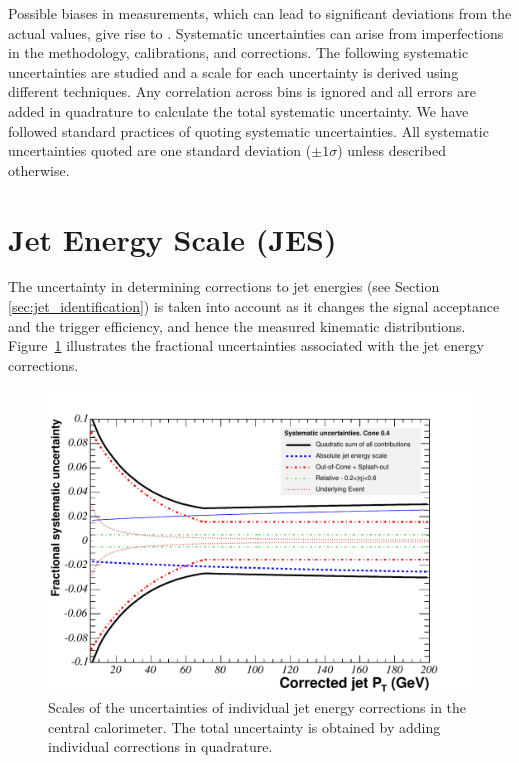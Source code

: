 \vspace{0.015\textheight}
Possible biases in measurements, which can lead to significant deviations from the actual values, give rise to . Systematic uncertainties can arise from imperfections in the methodology, calibrations, and corrections. The following systematic uncertainties are studied and a scale for each uncertainty is derived using different techniques. Any correlation across bins is ignored and all errors are added in quadrature to calculate the total systematic uncertainty. We have followed standard practices of quoting systematic uncertainties. All systematic uncertainties quoted are one standard deviation ($\pm1\sigma$) unless described otherwise.

\section{Jet Energy Scale (JES)}
The uncertainty in determining corrections to jet energies (see Section \ref{sec:jet_identification}) is taken into account as it changes the signal acceptance and the trigger efficiency, and hence the measured kinematic distributions. Figure~\ref{fig:JESFracSyst} illustrates the fractional uncertainties associated with the jet energy corrections.

\begin{figure}[htb!m]
 \centering
 \includegraphics[scale=0.8]{./JES_FractioanlSystUncertainty.pdf}
 \caption{Scales of the uncertainties of individual jet energy corrections in the central calorimeter. The total uncertainty is obtained by adding individual corrections in quadrature.}
 \label{fig:JESFracSyst}
\end{figure}


